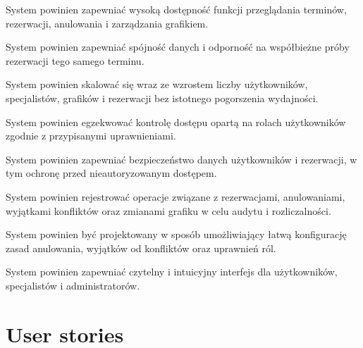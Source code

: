 \documentclass[12pt,a4paper]{article}
\begin{document}
\begin{description}[leftmargin=1.8cm, labelwidth=1.3cm, labelsep=0.5cm, style=nextline]
  \item[NFR1] System powinien zapewniać wysoką dostępność funkcji przeglądania terminów, rezerwacji, anulowania i zarządzania grafikiem.
\item[NFR2] System powinien zapewniać spójność danych i odporność na współbieżne próby rezerwacji tego samego terminu.
\item[NFR3] System powinien skalować się wraz ze wzrostem liczby użytkowników, specjalistów, grafików i rezerwacji bez istotnego pogorszenia wydajności.
\item[NFR4] System powinien egzekwować kontrolę dostępu opartą na rolach użytkowników zgodnie z przypisanymi uprawnieniami.
\item[NFR5] System powinien zapewniać bezpieczeństwo danych użytkowników i rezerwacji, w tym ochronę przed nieautoryzowanym dostępem.
\item[NFR6] System powinien rejestrować operacje związane z rezerwacjami, anulowaniami, wyjątkami konfliktów oraz zmianami grafiku w celu audytu i rozliczalności.
\item[NFR7] System powinien być projektowany w sposób umożliwiający łatwą konfigurację zasad anulowania, wyjątków od konfliktów oraz uprawnień ról.
\item[NFR8] System powinien zapewniać czytelny i intuicyjny interfejs dla użytkowników, specjalistów i administratorów.
\end{description}

\section{User stories}
\end{document}
